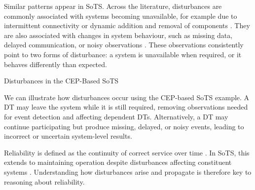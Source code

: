 Similar patterns appear in SoTS. Across the literature, disturbances are commonly associated with systems becoming unavailable, for example due to intermittent connectivity or dynamic addition and removal of components \cite{parri2019jarvis,human2023design,howard2021greenhouse}. They are also associated with changes in system behaviour, such as missing data, delayed communication, or noisy observations \cite{esterle2021digital,gill2022method,chen2018digital,duan2023digital}. These observations consistently point to two forms of disturbance: a system is unavailable when required, or it behaves differently than expected.

\begin{runningexample}{Disturbances in the CEP-Based SoTS}
\begin{center}

\end{center}
We can illustrate how disturbances occur using the CEP-based SoTS example. A DT may leave the system while it is still required, removing observations needed for event detection and affecting dependent DTs. Alternatively, a DT may continue participating but produce missing, delayed, or noisy events, leading to incorrect or uncertain system-level results.

\end{runningexample}

Reliability is defined as the continuity of correct service over time \cite{avizienis2004basic}. In SoTS, this extends to maintaining operation despite disturbances affecting constituent systems \cite{ferreira2023towards}. Understanding how disturbances arise and propagate is therefore key to reasoning about reliability.

